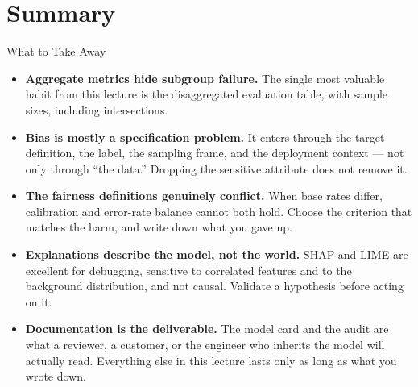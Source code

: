 \section{Summary}

\begin{frame}{What to Take Away}

    \begin{itemize}
        \setlength\itemsep{0.1em}
        \item \textbf{Aggregate metrics hide subgroup failure.} The single most valuable habit from
              this lecture is the disaggregated evaluation table, with sample sizes, including
              intersections.

        \item \textbf{Bias is mostly a specification problem.} It enters through the target
              definition, the label, the sampling frame, and the deployment context --- not only
              through ``the data.'' Dropping the sensitive attribute does not remove it.

        \item \textbf{The fairness definitions genuinely conflict.} When base rates differ,
              calibration and error-rate balance cannot both hold. Choose the criterion that
              matches the harm, and write down what you gave up.

        \item \textbf{Explanations describe the model, not the world.} SHAP and LIME are excellent
              for debugging, sensitive to correlated features and to the background distribution,
              and not causal. Validate a hypothesis before acting on it.

        \item \textbf{Documentation is the deliverable.} The model card and the audit are what a
              reviewer, a customer, or the engineer who inherits the model will actually read.
              Everything else in this lecture lasts only as long as what you wrote down.
    \end{itemize}
\end{frame}

